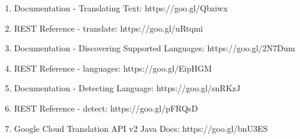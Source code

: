 \documentclass[../thesis.tex]{subfiles}
\begin{document}
\begin{enumerate}
  \item Documentation - Translating Text: https://goo.gl/Qbziwx
  \item REST Reference - translate: https://goo.gl/uRtqmi
  \item Documentation - Discovering Supported Languages: https://goo.gl/2N7Dum
  \item REST Reference - languages: https://goo.gl/EipHGM
  \item Documentation - Detecting Language: https://goo.gl/snRKzJ
  \item REST Reference - detect: https://goo.gl/pFRQsD
  \item Google Cloud Translation API v2 Java Docs: https://goo.gl/bnU3ES
\end{enumerate}
\end{document}
